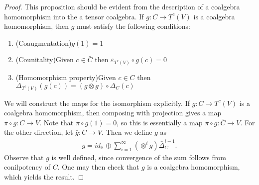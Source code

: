 \documentclass[../thesis.tex]{subfiles}
\begin{document}
            \begin{proof}
                This proposition should be evident from the description of a coalgebra homomorphism into the a tensor coalgebra. If $g:C\rightarrow T^c(V)$ is a coalgebra homomorphism, then $g$ must satisfy the following conditions:
                \begin{enumerate}
                    \item (Coaugmentation)\quad $g(1)=1$
                    \item (Counitality)\quad Given $c\in \bar{C}$ then $\varepsilon_{T^c(V)}\circ g(c)=0$
                    \item (Homomorphism property)\quad Given $c\in C$ then $\Delta_{T^c(V)}(g(c))=(g\otimes g)\circ\Delta_C(c)$
                \end{enumerate}

                We will construct the maps for the isomorphism explicitly. If $g:C\rightarrow T^c(V)$ is a coalgebra homomorphism, then composing with projection gives a map $\pi\circ g:C\rightarrow V$. Note that $\pi\circ g(1)=0$, so this is essentially a map $\pi\circ g:\bar{C}\rightarrow V$. For the other direction, let $\bar{g}:\bar{C}\rightarrow V$. Then we define $g$ as
                \begin{align*}
                    g = id_{\mathbb{K}} \oplus \sum_{i=1}^{\infty}(\otimes^{i}\bar{g})\bar{\Delta}_C^{i-1}.
                \end{align*}
                Observe that $g$ is well defined, since convergence of the sum follows from conilpotency of $C$. One may then check that $g$ is a coalgebra homomorphism, which yields the result.
            \end{proof}
\end{document}
